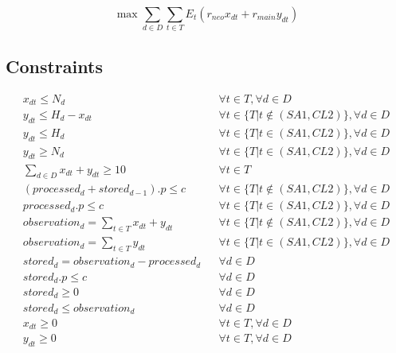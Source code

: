 \documentclass{article}
\begin{document}
	\begin{equation*}
	\max \sum_{d\in D}\sum_{t\in T}E_t(r_{neo} x_{dt} + r_{main} y_{dt})
	\end{equation*}
	
	\subsection*{Constraints}
	
	\begin{align}
		x_{dt} \leq N_d && \forall t\in T, \forall d\in D\label{C1}\\
		y_{dt} \leq H_d - x_{dt} && \forall t\in \{T | t \notin (SA1, CL2)\}, \forall d\in D\label{C2}\\
		y_{dt} \leq H_d && \forall t\in \{T | t \in (SA1, CL2)\}, \forall d\in D\label{C3}\\
		y_{dt} \geq N_d && \forall t\in \{T | t \in (SA1, CL2)\}, \forall d\in D\label{C4}\\
		\sum_{d\in D} x_{dt} + y_{dt} \geq 10 && \forall t \in T\label{C7}\\
		(processed_{d} + stored_{d-1}) . p \leq c && \forall t\in \{T | t \notin (SA1, CL2)\}, \forall d\in D\label{C5}\\
		processed_{d} . p \leq c && \forall t\in \{T | t \in (SA1, CL2)\}, \forall d\in D\label{C6}\\
		observation_{d} = \sum_{t\in T} x_{dt} + y_{dt} &&\forall t\in \{T | t \notin (SA1, CL2)\}, \forall d\in D\label{C15}\\
		observation_{d} = \sum_{t\in T} y_{dt} &&\forall t\in \{T | t \in (SA1, CL2)\}, \forall d\in D\label{C14}\\
		stored_{d} = observation_{d} - processed_{d} && \forall d\in D\label{C8}\\
		stored_{d} . p \leq c && \forall d\in D\label{C9}\\
		stored_{d} \geq 0 && \forall d\in D\label{C12}\\
		stored_{d} \leq observation_{d} && \forall d\in D\label{C13}\\
		x_{dt} \geq 0 && \forall t\in T, \forall d\in D\label{C10}\\
		y_{dt} \geq 0 && \forall t\in T, \forall d\in D\label{C11}
	\end{align}
	
\end{document}
